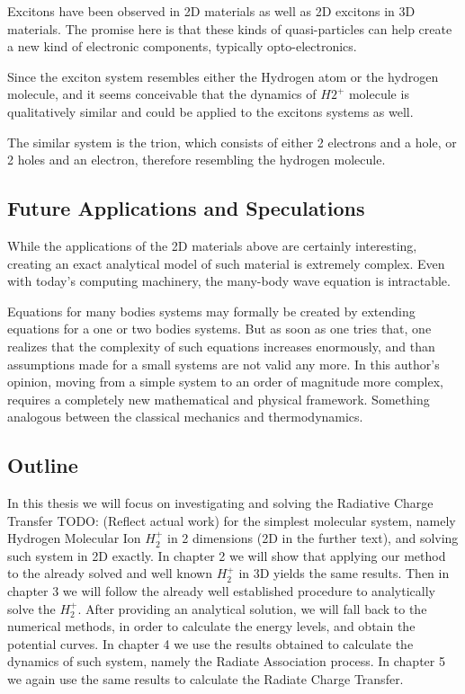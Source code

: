 Excitons have been observed in 2D materials\cite{Excitons2D2} as
well as 2D excitons in 3D materials. The promise here is that these kinds of quasi-particles can help create a new kind of electronic components, typically opto-electronics.

Since the exciton system resembles either the Hydrogen atom or the hydrogen molecule, and it seems conceivable that the dynamics of  $ H2^{+} $ molecule is qualitatively similar and could be applied to the excitons systems as well.

The similar system is the trion, which consists of either 2 electrons and a hole, or 2 holes and an electron, therefore resembling the hydrogen molecule. 

\subsection*{Future Applications and Speculations}

While the applications of the 2D materials above are certainly interesting, creating an exact analytical  model of such material is extremely complex. Even with today's computing machinery, the many-body wave equation is intractable.  

Equations for many bodies systems may formally be created by extending equations for a one or two bodies systems. But as soon as one tries that, one realizes that the complexity of such equations increases enormously, and than assumptions  made for a small systems are not valid any more. In this author's opinion, moving from a simple system to an order of magnitude more complex, requires a completely new mathematical and physical framework. Something analogous between the classical mechanics and thermodynamics.

\subsection*{Outline}
In this thesis we will focus on investigating and solving the Radiative Charge Transfer TODO: (Reflect actual work) for the simplest molecular system, namely Hydrogen Molecular Ion $ {H_2^{+}}  $ in 2 dimensions (2D in the further text), and solving such system in 2D exactly.  In chapter 2 we will show that applying our method to the already solved and well known $ {H_2^{+}} $ in 3D yields the same results. Then in chapter 3 we will follow  the already well established procedure \cite{Bates1} to analytically solve the $ {H_2^{+}} $. After providing an analytical solution, we will fall back to the numerical methods, in order to calculate the energy levels, and obtain the potential curves. In chapter 4  we use the results obtained to calculate the dynamics of such system, namely the Radiate Association process. In chapter 5 we again use the same results to calculate the Radiate Charge Transfer. 

